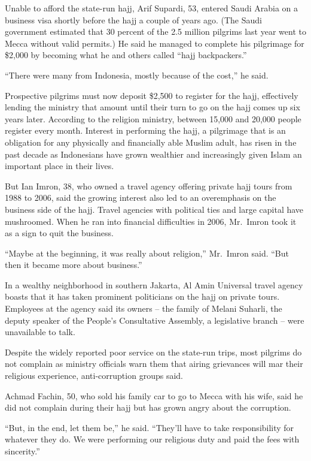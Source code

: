 ﻿\documentclass[12pt]{article}
\begin{document}
Unable to afford the state-run hajj, Arif Supardi, 53, entered Saudi Arabia on a business visa
shortly before the hajj a couple of years ago. (The Saudi government estimated that 30 percent of
the 2.5 million pilgrims last year went to Mecca without valid permits.) He said he managed to
complete his pilgrimage for \$2,000 by becoming what he and others called ``hajj backpackers.''

``There were many from Indonesia, mostly because of the cost,'' he said.

Prospective pilgrims must now deposit \$2,500 to register for the hajj, effectively lending the
ministry that amount until their turn to go on the hajj comes up six years later. According to the
religion ministry, between 15,000 and 20,000 people register every month. Interest in performing the
hajj, a pilgrimage that is an obligation for any physically and financially able Muslim adult, has
risen in the past decade as Indonesians have grown wealthier and increasingly given Islam an
important place in their lives.

But Ian Imron, 38, who owned a travel agency offering private hajj tours from 1988 to 2006, said the
growing interest also led to an overemphasis on the business side of the hajj. Travel agencies with
political ties and large capital have mushroomed. When he ran into financial difficulties in 2006,
Mr.~Imron took it as a sign to quit the business.

``Maybe at the beginning, it was really about religion,'' Mr.~Imron said. ``But then it became more
about business.''

In a wealthy neighborhood in southern Jakarta, Al Amin Universal travel agency boasts that it has
taken prominent politicians on the hajj on private tours. Employees at the agency said its owners --
the family of Melani Suharli, the deputy speaker of the People's Consultative Assembly, a
legislative branch -- were unavailable to talk.

Despite the widely reported poor service on the state-run trips, most pilgrims do not complain as
ministry officials warn them that airing grievances will mar their religious experience,
anti-corruption groups said.

Achmad Fachin, 50, who sold his family car to go to Mecca with his wife, said he did not complain
during their hajj but has grown angry about the corruption.

``But, in the end, let them be,'' he said. ``They'll have to take responsibility for whatever they
do. We were performing our religious duty and paid the fees with sincerity.''
\end{document}
